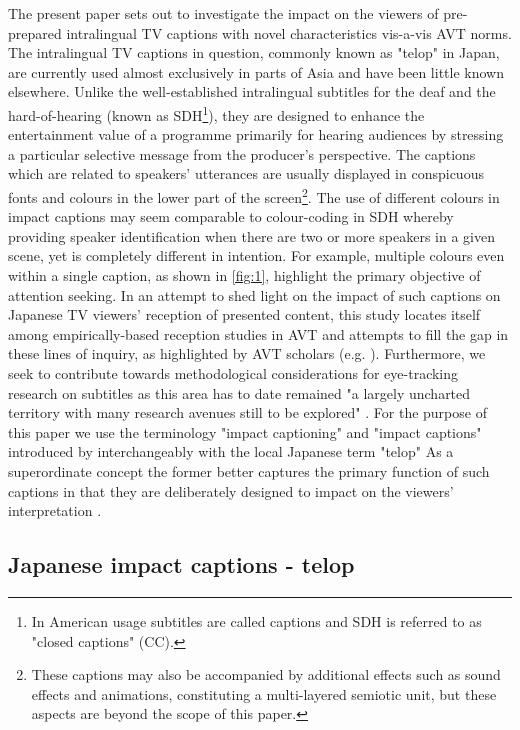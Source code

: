 \documentclass[output=paper]{langsci/langscibook}
\begin{document}
The present paper sets out to investigate the impact on the viewers of pre-prepared intralingual TV captions with novel characteristics vis-a-vis AVT norms. The intralingual TV captions in question, commonly known as "telop" in Japan, are currently used almost exclusively in parts of Asia and have been little known elsewhere.  Unlike the well-established intralingual subtitles for the deaf and the hard-of-hearing (known as SDH\footnote{In American usage subtitles are called captions and SDH is referred to as "closed captions" (CC).}), they are designed to enhance the entertainment value of a programme primarily for hearing audiences by stressing a particular selective message from the producer's perspective. The captions which are related to speakers' utterances are usually displayed in conspicuous fonts and colours in the lower part of the screen\footnote{ These captions may also be accompanied by additional effects such as sound effects and animations, constituting a multi-layered semiotic unit, but these aspects are beyond the scope of this paper.}. The use of different colours in impact captions may seem comparable to colour-coding in SDH whereby providing speaker identification when there are two or more speakers in a given scene, yet is completely different in intention. For example, multiple colours even within a single caption, as shown in \ref{fig:1}, highlight the primary objective of attention seeking. In an attempt to shed light on the impact of such captions on Japanese TV viewers' reception of presented content, this study locates itself among empirically-based reception studies in AVT and attempts to fill the gap in these lines of inquiry, as highlighted by AVT scholars (e.g. \citet{gambier2013}). Furthermore, we seek to contribute towards methodological considerations for eye-tracking research on subtitles as this area has to date remained "a largely uncharted territory with many research avenues still to be explored" \citep[n.p.]{Kruger2015}.  For the purpose of this paper we use the terminology "impact captioning" and "impact captions" introduced by \citet{Park2009} interchangeably with the local Japanese term "telop" As a superordinate concept the former better captures the primary function of such captions in that they are deliberately designed to impact on the viewers' interpretation \citep{Shiota2003}.

\subsection{Japanese impact captions - telop}
\end{document}

